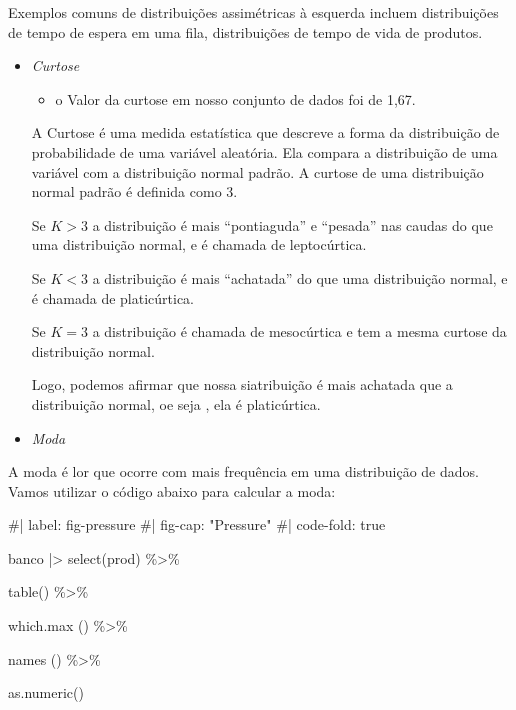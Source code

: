 \documentclass[
  letterpaper,
  DIV=11,
  numbers=noendperiod]{scrartcl}
\newenvironment{Shaded}{\begin{snugshade}}{\end{snugshade}}
\newcommand{\CommentTok}[1]{\textcolor[rgb]{0.37,0.37,0.37}{#1}}
\newcommand{\FunctionTok}[1]{\textcolor[rgb]{0.28,0.35,0.67}{#1}}
\newcommand{\NormalTok}[1]{\textcolor[rgb]{0.00,0.23,0.31}{#1}}
\newcommand{\SpecialCharTok}[1]{\textcolor[rgb]{0.37,0.37,0.37}{#1}}
\providecommand{\tightlist}{%
  \setlength{\itemsep}{0pt}\setlength{\parskip}{0pt}}\usepackage{longtable,booktabs,array}
\begin{document}
Exemplos comuns de distribuições assimétricas à esquerda incluem
distribuições de tempo de espera em uma fila, distribuições de tempo de
vida de produtos.

\begin{itemize}
\item
  \emph{Curtose}

  \begin{itemize}
  \tightlist
  \item
    o Valor da curtose em nosso conjunto de dados foi de 1,67.
  \end{itemize}

  A Curtose é uma medida estatística que descreve a forma da
  distribuição de probabilidade de uma variável aleatória. Ela compara a
  distribuição de uma variável com a distribuição normal padrão. A
  curtose de uma distribuição normal padrão é definida como 3.

  Se \(K >3\) a distribuição é mais ``pontiaguda'' e ``pesada'' nas
  caudas do que uma distribuição normal, e é chamada de leptocúrtica.

  Se \(K < 3\) a distribuição é mais ``achatada'' do que uma
  distribuição normal, e é chamada de platicúrtica.

  Se \(K = 3\) a distribuição é chamada de mesocúrtica e tem a mesma
  curtose da distribuição normal.

  Logo, podemos afirmar que nossa siatribuição é mais achatada que a
  distribuição normal, oe seja , ela é platicúrtica.
\item
  \emph{Moda}
\end{itemize}

A moda é lor que ocorre com mais frequência em uma distribuição de
dados. Vamos utilizar o código abaixo para calcular a moda:

\begin{Shaded}
\begin{Highlighting}[]
\CommentTok{\#| label: fig{-}pressure}
\CommentTok{\#| fig{-}cap: "Pressure"}
\CommentTok{\#| code{-}fold: true}



\NormalTok{banco }\SpecialCharTok{|\textgreater{}}  \FunctionTok{select}\NormalTok{(prod)  }\SpecialCharTok{\%\textgreater{}\%} 

                 \FunctionTok{table}\NormalTok{()     }\SpecialCharTok{\%\textgreater{}\%}

                 \FunctionTok{which.max}\NormalTok{ () }\SpecialCharTok{\%\textgreater{}\%} 

                 \FunctionTok{names}\NormalTok{ ()     }\SpecialCharTok{\%\textgreater{}\%}  

                 \FunctionTok{as.numeric}\NormalTok{()}
\end{Highlighting}
\end{Shaded}
\end{document}
